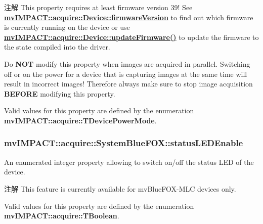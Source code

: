 \begin{DoxyNote}{注解}
This property requires at least firmware version 39! See {\bfseries \hyperlink{classmv_i_m_p_a_c_t_1_1acquire_1_1_device_a74abbd0bc1fda2dce54e28c6076f9528}{mv\+I\+M\+P\+A\+C\+T\+::acquire\+::\+Device\+::firmware\+Version}} to find out which firmware is currently running on the device or use {\bfseries \hyperlink{classmv_i_m_p_a_c_t_1_1acquire_1_1_device_aa5584b58e68c8e3237b7fcdb698d36b7}{mv\+I\+M\+P\+A\+C\+T\+::acquire\+::\+Device\+::update\+Firmware()}} to update the firmware to the state compiled into the driver.

Do {\bfseries N\+O\+T} modify this property when images are acquired in parallel. Switching off or on the power for a device that is capturing images at the same time will result in incorrect images! Therefore always make sure to stop image acquisition {\bfseries B\+E\+F\+O\+R\+E} modifying this property.
\end{DoxyNote}
Valid values for this property are defined by the enumeration {\bfseries mv\+I\+M\+P\+A\+C\+T\+::acquire\+::\+T\+Device\+Power\+Mode}. \hypertarget{classmv_i_m_p_a_c_t_1_1acquire_1_1_system_blue_f_o_x_a2325109394ecc9b7c202b5512b5ecea8}{
\subsubsection[{status\+L\+E\+D\+Enable}]{ mv\+I\+M\+P\+A\+C\+T\+::acquire\+::\+System\+Blue\+F\+O\+X\+::status\+L\+E\+D\+Enable}}\label{classmv_i_m_p_a_c_t_1_1acquire_1_1_system_blue_f_o_x_a2325109394ecc9b7c202b5512b5ecea8}


An enumerated integer property allowing to switch on/off the status L\+E\+D of the device. 

\begin{DoxyNote}{注解}
This feature is currently available for mv\+Blue\+F\+O\+X-\/\+M\+L\+C devices only.
\end{DoxyNote}
Valid values for this property are defined by the enumeration {\bfseries mv\+I\+M\+P\+A\+C\+T\+::acquire\+::\+T\+Boolean}.


